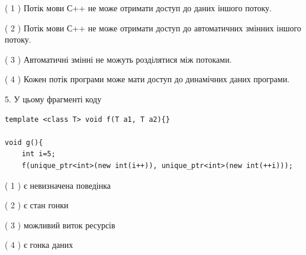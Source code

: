\documentclass[12pt, ukrainian]{article}
\begin{document}
\begin {large}
{( 1 ) Потік мови С++ не може отримати доступ до даних іншого потоку.%

( 2 ) Потік мови С++ не може отримати доступ до автоматичних змінних іншого потоку.%

( 3 ) Автоматичні змінні не можуть розділятися між потоками.%

( 4 ) Кожен потік програми може мати доступ до динамічних даних програми.%


5. У цьому фрагменті коду
\begin{verbatim}
template <class T> void f(T a1, T a2){}

void g(){
    int i=5;
    f(unique_ptr<int>(new int(i++)), unique_ptr<int>(new int(++i)));
\end{verbatim}

( 1 ) є невизначена поведінка%

( 2 ) є стан гонки%

( 3 ) можливий виток ресурсів%

( 4 ) є гонка даних%
}
\end {large}
\end{document}
